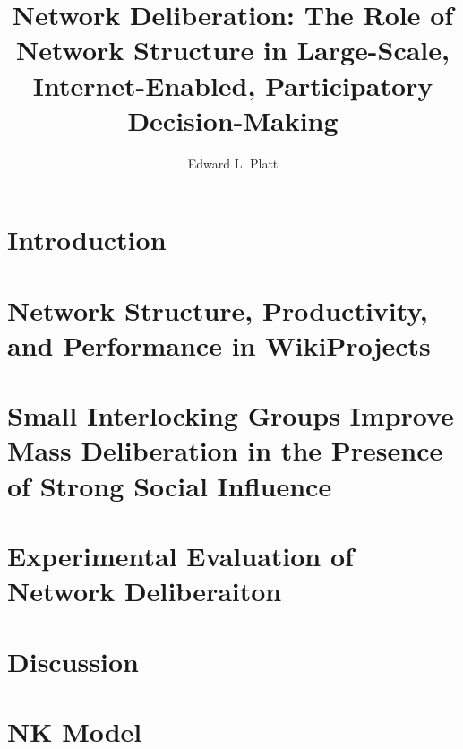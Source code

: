 \documentclass[thesis]{thesis-umich}
\title{Network Deliberation: The Role of Network Structure in Large-Scale, Internet-Enabled, Participatory Decision-Making}
\author{Edward L. Platt}
\begin{document}
\chapter{Introduction}
\label{chap:intro}


\chapter{Network Structure, Productivity, and Performance in WikiProjects}
\label{chap:wp-prod-perf}


\chapter{Small Interlocking Groups Improve Mass Deliberation in the Presence of Strong Social Influence}
\label{chap:abm}


\chapter{Experimental Evaluation of Network Deliberaiton}
\label{chap:experiment}


\chapter{Discussion}
\label{chap:discussion}

%

\appendix
\chapter{NK Model}
\label{apx:nk}





\end{document}
